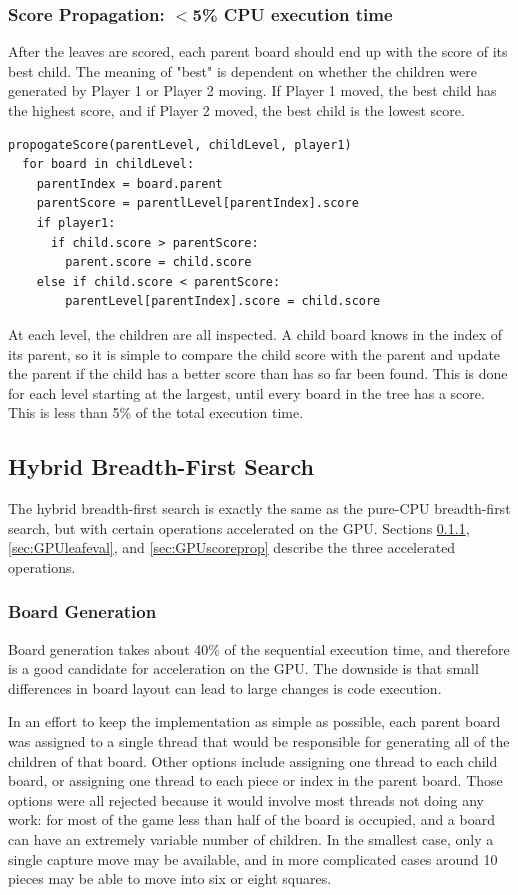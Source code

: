 \documentclass[11pt]{article}
\begin{document}
\subsubsection{Score Propagation: $<$5\% CPU execution time}
\label{cpupropagation}
After the leaves are scored, each parent board should end up with the score of
its best child. The meaning of "best" is dependent on whether the children
were generated by Player 1 or Player 2 moving. If Player 1 moved, the best child
has the highest score, and if Player 2 moved, the best child is the lowest
score.

\begin{lstlisting}
propogateScore(parentLevel, childLevel, player1)
  for board in childLevel:
    parentIndex = board.parent
    parentScore = parentlLevel[parentIndex].score
    if player1:
      if child.score > parentScore:
        parent.score = child.score
    else if child.score < parentScore:
        parentLevel[parentIndex].score = child.score
\end{lstlisting}

At each level, the children are all inspected. A child board knows in the index
of its parent, so it is simple to compare the child score with the parent
and update the parent if the child has a better score than has so far been
found. This is done for each level starting at the largest, until every board
in the tree has a score. This is less than 5\% of the total execution time.
\newpage
\subsection{Hybrid Breadth-First Search}
The hybrid breadth-first search is exactly the same as the pure-CPU
breadth-first search, but with certain operations accelerated on the GPU.
Sections \ref{sec:GPUboardgen}, \ref{sec:GPUleafeval}, and 
\ref{sec:GPUscoreprop} describe the three accelerated operations.

\subsubsection{Board Generation}
\label{sec:GPUboardgen}
Board generation takes about 40\% of the sequential execution time, and
therefore is a good candidate for acceleration on the GPU. The downside is that
small differences in board layout can lead to large changes is code execution.

In an effort to keep the implementation as simple as possible, each parent
board was assigned to a single thread that would be responsible for generating
all of the children of that board. Other options include assigning one thread
to each child board, or assigning one thread to each piece or index in the 
parent board. Those options were all rejected because it would involve most
threads not doing any work: for most of the game less than half of the board
is occupied, and a board can have an extremely variable number of children. In
the smallest case, only a single capture move may be
available, and in more complicated cases around 10 pieces may be able to move
into six or eight squares. 
\end{document}
